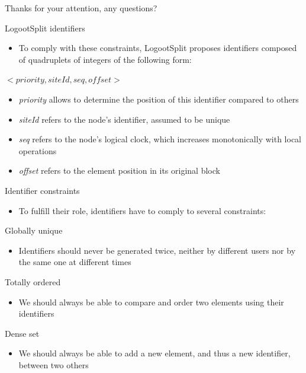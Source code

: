 \documentclass[10pt]{beamer}
\begin{document}
\begin{frame}[standout]
  Thanks for your attention, any questions?
  \vspace{3em}
  \begin{center}
    \ccby
  \end{center}
\end{frame}

\begin{frame}{LogootSplit identifiers}
  \begin{itemize}
    \item To comply with these constraints, LogootSplit proposes identifiers composed of quadruplets of integers of the following form:
  \end{itemize}
  \begin{center}
    $<priority, siteId, seq, offset>$
  \end{center}
  \begin{itemize}
    \item \emph{priority} allows to determine the position of this identifier compared to others
    \item \emph{siteId} refers to the node's identifier, assumed to be unique
    \item \emph{seq} refers to the node's logical clock, which increases monotonically with local operations
    \item \emph{offset} refers to the element position in its original block
  \end{itemize}
\end{frame}

\begin{frame}{Identifier constraints}

  \begin{itemize}
    \item To fulfill their role, identifiers have to comply to several constraints:
  \end{itemize}

  \begin{block}{Globally unique}
    \begin{itemize}
      \item Identifiers should never be generated twice, neither by different users nor by the same one at different times
    \end{itemize}
  \end{block}
  \begin{block}{Totally ordered}
    \begin{itemize}
      \item We should always be able to compare and order two elements using their identifiers
    \end{itemize}
  \end{block}
  \begin{block}{Dense set}
    \begin{itemize}
      \item We should always be able to add a new element, and thus a new identifier, between two others
    \end{itemize}
  \end{block}
\end{frame}
\end{document}
